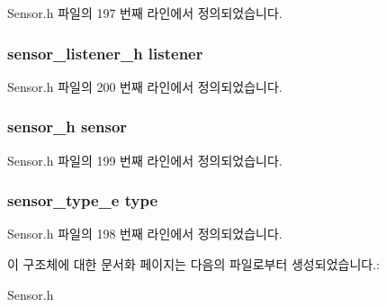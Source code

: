 Sensor.\-h 파일의 197 번째 라인에서 정의되었습니다.

\hypertarget{struct___linear_accelation_extend_aa977dfb866b24fd7d9a20a9a01b2fd1f}{
\subsubsection[{listener}]{\setlength{\rightskip}{0pt plus 5cm}sensor\-\_\-listener\-\_\-h listener}}\label{struct___linear_accelation_extend_aa977dfb866b24fd7d9a20a9a01b2fd1f}


Sensor.\-h 파일의 200 번째 라인에서 정의되었습니다.

\hypertarget{struct___linear_accelation_extend_a5bae9b7801bc3808411925cde81d3f26}{
\subsubsection[{sensor}]{\setlength{\rightskip}{0pt plus 5cm}sensor\-\_\-h sensor}}\label{struct___linear_accelation_extend_a5bae9b7801bc3808411925cde81d3f26}


Sensor.\-h 파일의 199 번째 라인에서 정의되었습니다.

\hypertarget{struct___linear_accelation_extend_abffb09766da2fc510a79bb51f82a36e1}{
\subsubsection[{type}]{\setlength{\rightskip}{0pt plus 5cm}sensor\-\_\-type\-\_\-e type}}\label{struct___linear_accelation_extend_abffb09766da2fc510a79bb51f82a36e1}


Sensor.\-h 파일의 198 번째 라인에서 정의되었습니다.



이 구조체에 대한 문서화 페이지는 다음의 파일로부터 생성되었습니다.\-:\begin{DoxyCompactItemize}
\item 
Sensor.\-h\end{DoxyCompactItemize}
